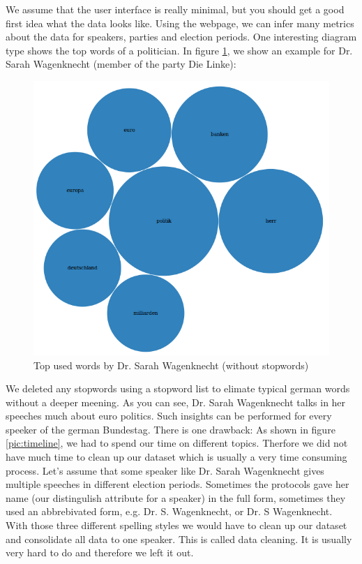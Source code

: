 \documentclass[12pt,paper=a4,nenglish]{scrreprt}
\begin{document}
We assume that the user interface is really minimal, but you should get a good
first idea what the data looks like. Using the webpage, we can infer many
metrics about the data for speakers, parties and election periods. 
One interesting diagram type shows the top words of a politician. In
figure \ref{pic:wagenknecht_topwords}, we show an example for Dr. Sarah
Wagenknecht (member of the party Die Linke):
\begin{figure}[H] 
	\centering
	\includegraphics[scale=0.6]{res/wagenknecht_topwords.png}
	\caption{Top used words by Dr. Sarah Wagenknecht (without stopwords)}%
	\label{pic:wagenknecht_topwords}%
\end{figure}%
We deleted any stopwords using a stopword list to elimate typical german words
without a deeper meening. As you can see, Dr. Sarah Wagenknecht talks in her
speeches much about euro politics. Such insights can be performed for every
speeker of the german Bundestag. There is one drawback: As shown in figure
\ref{pic:timeline}, we had to spend our time on different topics. Therfore we
did not have much time to clean up our dataset which is usually a very time
consuming process.
Let's assume that some speaker like Dr. Sarah Wagenknecht gives multiple speeches in different election
periods. Sometimes the protocols gave her name (our distingulish attribute for
a speaker) in the full form, sometimes they used an abbrebivated form, e.g. Dr.
S. Wagenknecht, or Dr. S Wagenknecht. With those three different spelling styles
we would have to clean up our dataset and consolidate all data to one speaker.
This is called data cleaning. It is usually very hard to do and therefore we
left it out. 
\end{document}
